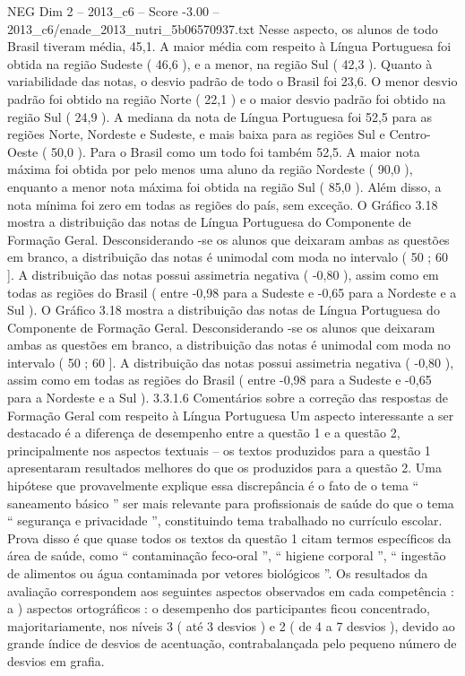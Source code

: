 \begin{textsample}{NEG Dim 2 – 2013\_c6 – Score -3.00 – 2013\_c6/enade\_2013\_nutri\_5b06570937.txt}
Nesse aspecto, os alunos de todo Brasil tiveram média, 45,1.
A maior média com respeito à Língua Portuguesa foi obtida na região Sudeste ( 46,6 ), e a menor, na região Sul ( 42,3 ).
Quanto à variabilidade das notas, o desvio padrão de todo o Brasil foi 23,6.
O menor desvio padrão foi obtido na região Norte ( 22,1 ) e o maior desvio padrão foi obtido na região Sul ( 24,9 ).
A mediana da nota de Língua Portuguesa foi 52,5 para as regiões Norte, Nordeste e Sudeste, e mais baixa para as regiões Sul e Centro-Oeste ( 50,0 ).
Para o Brasil como um todo foi também 52,5.
A maior nota máxima foi obtida por pelo menos uma aluno da região Nordeste ( 90,0 ), enquanto a menor nota máxima foi obtida na região Sul ( 85,0 ).
Além disso, a nota mínima foi zero em todas as regiões do país, sem exceção.
O Gráfico 3.18 mostra a distribuição das notas de Língua Portuguesa do Componente de Formação Geral.
Desconsiderando -se os alunos que deixaram ambas as questões em branco, a distribuição das notas é unimodal com moda no intervalo ( 50 ; 60 ].
A distribuição das notas possui assimetria negativa ( -0,80 ), assim como em todas as regiões do Brasil ( entre -0,98 para a Sudeste e -0,65 para a Nordeste e a Sul ).
O Gráfico 3.18 mostra a distribuição das notas de Língua Portuguesa do Componente de Formação Geral.
Desconsiderando -se os alunos que deixaram ambas as questões em branco, a distribuição das notas é unimodal com moda no intervalo ( 50 ; 60 ].
A distribuição das notas possui assimetria negativa ( -0,80 ), assim como em todas as regiões do Brasil ( entre -0,98 para a Sudeste e -0,65 para a Nordeste e a Sul ). 3.3.1.6 Comentários sobre a correção das respostas de Formação Geral com respeito à Língua Portuguesa Um aspecto interessante a ser destacado é a diferença de desempenho entre a questão 1 e a questão 2, principalmente nos aspectos textuais – os textos produzidos para a questão 1 apresentaram resultados melhores do que os produzidos para a questão 2.
Uma hipótese que provavelmente explique essa discrepância é o fato de o tema “ saneamento básico ” ser mais relevante para profissionais de saúde do que o tema “ segurança e privacidade ”, constituindo tema trabalhado no currículo escolar.
Prova disso é que quase todos os textos da questão 1 citam termos específicos da área de saúde, como “ contaminação feco-oral ”, “ higiene corporal ”, “ ingestão de alimentos ou água contaminada por vetores biológicos ”.
Os resultados da avaliação correspondem aos seguintes aspectos observados em cada competência : a ) aspectos ortográficos : o desempenho dos participantes ficou concentrado, majoritariamente, nos níveis 3 ( até 3 desvios ) e 2 ( de 4 a 7 desvios ), devido ao grande índice de desvios de acentuação, contrabalançada pelo pequeno número de desvios em grafia.

\end{textsample}
